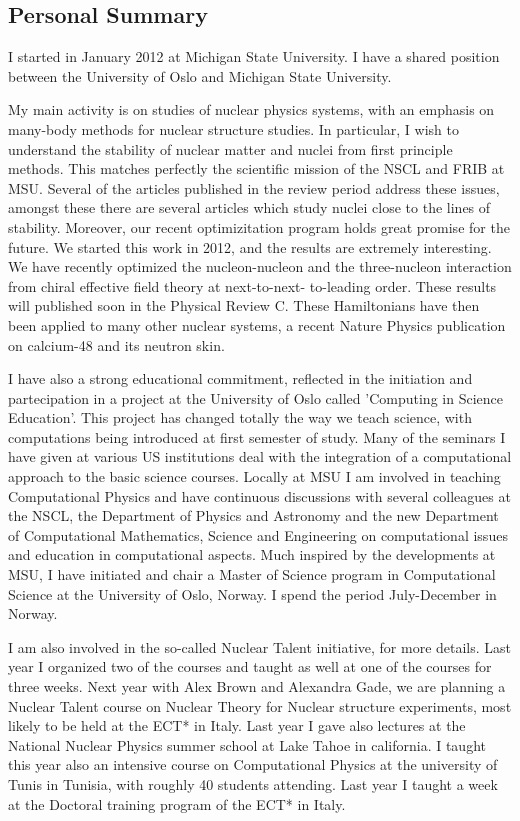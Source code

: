 \documentclass[prc,amsart,english,twocolumn,superscriptaddress,showpacs,floatfix]{revtex4}
\begin{document}
\subsection*{Personal Summary}

I started in January 2012 at Michigan State University. I have a
shared position between the University of Oslo and Michigan State
University.

My main activity is on studies of nuclear physics systems, with an
emphasis on many-body methods for nuclear structure studies. In
particular, I wish to understand the stability of nuclear matter and
nuclei from first principle methods. This matches perfectly the
scientific mission of the NSCL and FRIB at MSU.  Several of the
articles published in the review period address these issues, amongst
these there are several articles which study
nuclei close to the lines of stability.  Moreover, our recent
optimizitation program holds great promise for the future.  We 
started this work in 2012, and the results are extremely interesting.  We
have recently optimized the nucleon-nucleon and the three-nucleon interaction from chiral
effective field theory at next-to-next- to-leading order. These results will published soon in the Physical Review C. These Hamiltonians have then been applied to many other 
nuclear systems, a recent Nature Physics publication on calcium-48 and its neutron skin.

I have also a strong educational commitment, reflected in the initiation and partecipation in a project at the University of Oslo called 'Computing in Science Education'. This project has changed totally the way we teach science, with computations being introduced at first semester of study. Many of the seminars I have given at various US institutions deal with the integration of a computational approach to the basic science courses. Locally at MSU I am involved in teaching Computational Physics and have continuous discussions with several colleagues at the NSCL, the Department of Physics and Astronomy and the new Department of Computational Mathematics, Science and Engineering on computational issues and education in computational aspects. Much inspired by the developments at MSU, I have initiated and chair a Master of Science program in Computational Science at the University of Oslo, Norway. I spend the period July-December in Norway. 

I am also involved in the so-called Nuclear Talent initiative,  for more details. Last year I organized two of the courses and taught as well at one of the courses for three weeks. Next year with Alex Brown and Alexandra Gade, we are planning a Nuclear Talent course on Nuclear Theory for Nuclear structure experiments, most likely to be held at the ECT* in Italy. Last year I gave also lectures at the National Nuclear Physics summer school at Lake Tahoe in california. I taught this year also an intensive course on Computational Physics at the university of Tunis in Tunisia, with roughly 40 students attending. Last year I taught a week at the Doctoral training program of the ECT* in Italy. 
\end{document}
